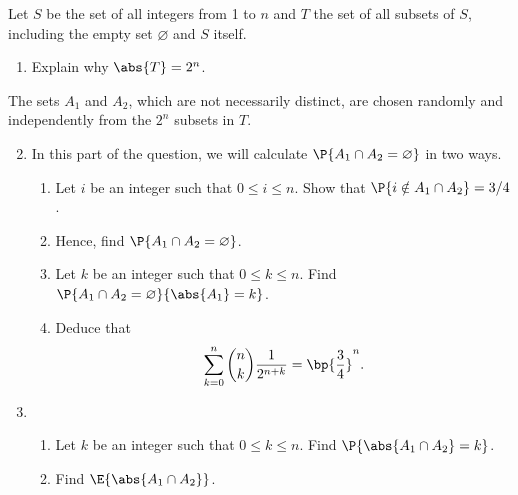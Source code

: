 \begin{problem}
    Let $S$ be the set of all integers from 1 to $n$ and $T$ the set of all subsets of $S$, including the empty set $\varnothing$ and $S$ itself.

    \begin{enumerate}
        \item Explain why $\abs{T} = 2^n$.
    \end{enumerate}

    The sets $A_1$ and $A_2$, which are not necessarily distinct, are chosen randomly and independently from the $2^n$ subsets in $T$.

    \begin{enumerate}
        \setcounter{enumi}{1}
        \item In this part of the question, we will calculate $\P{A_1 \cap A_2 = \varnothing}$ in two ways.
        \begin{enumerate}
            \item Let $i$ be an integer such that $0 \leq i \leq n$. Show that $\P{i \notin A_1 \cap A_2} = 3/4$.
            \item Hence, find $\P{A_1 \cap A_2 = \varnothing}$.
            \item Let $k$ be an integer such that $0 \leq k \leq n$. Find $\P{A_1 \cap A_2 = \varnothing}{\abs{A_1} = k}$.
            \item Deduce that \[\sum_{k = 0}^n \binom{n}{k} \frac1{2^{n+k}} = \bp{\frac34}^n.\]
        \end{enumerate}
        \item \begin{enumerate}
            \item Let $k$ be an integer such that $0 \leq k \leq n$. Find $\P{\abs{A_1 \cap A_2} = k}$.
            \item Find $\E{\abs{A_1 \cap A_2}}$.
        \end{enumerate}
    \end{enumerate}
\end{problem}
